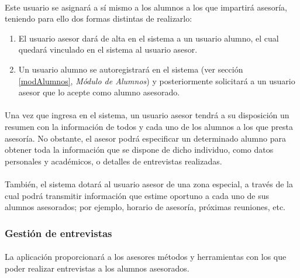       \paragraph{}Este usuario se asignará a sí mismo a los alumnos a los que
      impartirá asesoría, teniendo para ello dos formas distintas de realizarlo:

      \begin{enumerate}
       \item El usuario asesor dará de alta en el sistema a un usuario alumno,
             el cual quedará vinculado en el sistema al usuario asesor.
       \item Un usuario alumno se autoregistrará en el sistema (ver sección
       \ref{modAlumnos}, \textit{Módulo de Alumnos}) y posteriormente solicitará
       a un usuario asesor que lo acepte como alumno asesorado.
      \end{enumerate}


      \paragraph{}Una vez que ingresa en el sistema, un usuario asesor tendrá
      a su disposición un resumen con la información de todos y cada uno de los
      alumnos a los que presta asesoría. No obstante, el asesor podrá
      especificar un determinado alumno para obtener toda la información que
      se dispone de dicho individuo, como datos personales y académicos, o
      detalles de entrevistas realizadas.

      \paragraph{}También, el sistema dotará al usuario asesor de una
      zona especial, a través de la cual podrá transmitir información que estime
      oportuno a cada uno de sus alumnos asesorados; por ejemplo, horario
      de asesoría, próximas reuniones, etc.

      \subsubsection{Gestión de entrevistas}

      \paragraph{}La aplicación proporcionará a los asesores métodos y
      herramientas con los que poder realizar entrevistas a los alumnos
      asesorados.

